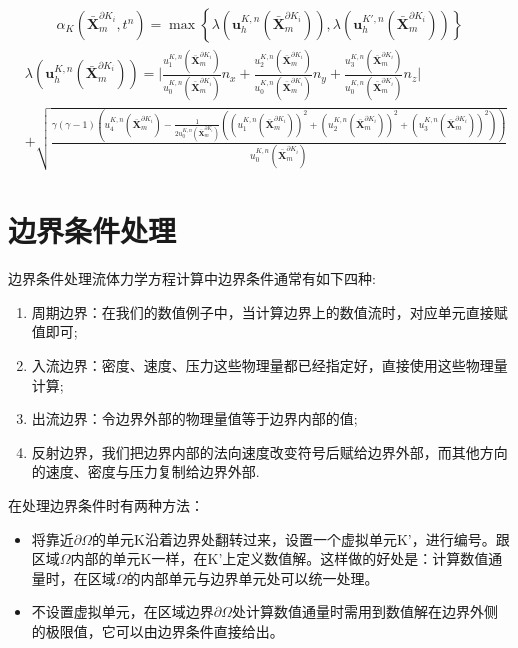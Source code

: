 \documentclass[a4paper, 12pt, UTF8]{ctexart}
\newcommand{\bs}[1]{\boldsymbol{#1}}
\begin{document}
\begin{equation}
\begin{split}
\alpha_{K}(\bar{\bs{X}}_{m}^{\partial K_i},t^n)=\max \left\{\lambda\left(\bs u_{h}^{K,n}(\bar{\bs{X}}_{m}^{\partial K_i})\right), \lambda\left(\bs u_h^{K', n}(\bar{\bs{X}}_{m}^{\partial K_i})\right)\right\}
\end{split}
\end{equation}
\begin{equation}
\begin{split}
&{\lambda}(\bs u_{h}^{K,n}(\bar{\bs{X}}_{m}^{\partial K_i}))=\Big|\frac{u_1^{K,n}(\bar{\bs{X}}_{m}^{\partial K_i})}{ u_0^{K,n}(\bar{\bs{X}}_{m}^{\partial K_i})}n_x+\frac{ u_2^{K,n}(\bar{\bs{X}}_{m}^{\partial K_i})}{ u_0^{K,n}(\bar{\bs{X}}_{m}^{\partial K_i})}n_y+\frac{ u_3^{K,n}(\bar{\bs{X}}_{m}^{\partial K_i})}{ u_0^{K,n}(\bar{\bs{X}}_{m}^{\partial K_i})}n_z\Big|\\
&+\sqrt{\frac{\gamma (\gamma-1)\left(u_4^{K,n}(\bar{\bs{X}}_{m}^{\partial K_i})-\frac{1}{2{u_0^{K,n}(\bar{\bs{X}}_{m}^{\partial K_i})}} \left(( u_1^{K,n}(\bar{\bs{X}}_{m}^{\partial K_i}))^{2}+(u_{2}^{K,n}(\bar{\bs{X}}_{m}^{\partial K_i}))^{2}+(u_{3}^{K,n}(\bar{\bs{X}}_{m}^{\partial K_i}))^{2}\right)\right)}{u_0^{K,n}(\bar{\bs{X}}_{m}^{\partial K_i})}}
\end{split}
\end{equation}



\section{边界条件处理}
边界条件处理流体力学方程计算中边界条件通常有如下四种:
\begin{enumerate}
\item 周期边界：在我们的数值例子中，当计算边界上的数值流时，对应单元直接赋值即可;
\item 入流边界：密度、速度、压力这些物理量都已经指定好，直接使用这些物理量计算;
\item 出流边界：令边界外部的物理量值等于边界内部的值;
\item 反射边界，我们把边界内部的法向速度改变符号后赋给边界外部，而其他方向的速度、密度与压力复制给边界外部.

\end{enumerate}
在处理边界条件时有两种方法：
\begin{itemize}
	\item 将靠近$\partial\Omega$的单元K沿着边界处翻转过来，设置一个虚拟单元K'，进行编号。跟区域$\Omega$内部的单元K一样，在K'上定义数值解。这样做的好处是：计算数值通量时，在区域$\Omega$的内部单元与边界单元处可以统一处理。
	
	\item 不设置虚拟单元，在区域边界$\partial\Omega$处计算数值通量时需用到数值解在边界外侧的极限值，它可以由边界条件直接给出。
\end{itemize}
\end{document}
